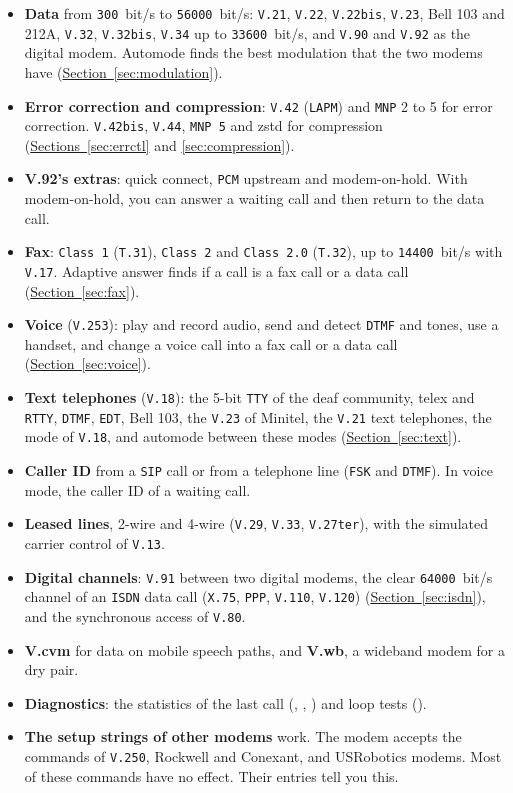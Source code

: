 \documentclass[a5paper,10pt]{article}
\makeatletter
\newcommand{\cmd}[1]{\texttt{#1}}
\newcommand{\std}[1]{\texttt{#1}}
\newcommand{\cmdl}[2][]{\hyperlink{cmd:#1}{\cmd{#2}}}
\let\cmd\@firstofone
\makeatother
\begin{document}
\begin{itemize}
\item \textbf{Data} from \std{300}~bit/s to \std{56000}~bit/s: \std{V.21}, \std{V.22},
  \std{V.22bis}, \std{V.23}, Bell 103 and 212A, \std{V.32}, \std{V.32bis},
  \std{V.34} up to \std{33600}~bit/s, and \std{V.90} and \std{V.92} as the
  digital modem.  Automode finds the best modulation that the two modems
  have (\hyperref[sec:modulation]{Section~\ref*{sec:modulation}}).
\item \textbf{Error correction and compression}: \std{V.42} (\std{LAPM}) and
  \std{MNP} 2 to 5 for error correction.  \std{V.42bis}, \std{V.44}, \std{MNP~5}
  and zstd for compression
  (\hyperref[sec:errctl]{Sections~\ref*{sec:errctl}} and
  \hyperref[sec:compression]{\ref*{sec:compression}}).
\item \textbf{V.92's extras}: quick connect, \std{PCM} upstream and
  modem-on-hold.  With modem-on-hold, you can answer a waiting call and
  then return to the data call.
\item \textbf{Fax}: \std{Class 1} (\std{T.31}), \std{Class 2} and \std{Class 2.0} (\std{T.32}),
  up to \std{14400}~bit/s with \std{V.17}.  Adaptive answer finds if a call is
  a fax call or a data call (\hyperref[sec:fax]{Section~\ref*{sec:fax}}).
\item \textbf{Voice} (\std{V.253}): play and record audio, send and
  detect \std{DTMF} and tones, use a handset, and change a voice call into a
  fax call or a data call (\hyperref[sec:voice]{Section~\ref*{sec:voice}}).
\item \textbf{Text telephones} (\std{V.18}): the 5-bit \std{TTY} of the deaf
  community, telex and \std{RTTY}, \std{DTMF}, \std{EDT}, Bell 103, the \std{V.23}
  of Minitel, the \std{V.21} text telephones, the mode of \std{V.18}, and
  automode between these modes (\hyperref[sec:text]{Section~\ref*{sec:text}}).
\item \textbf{Caller ID} from a \std{SIP} call or from a telephone line (\std{FSK}
  and \std{DTMF}).  In voice mode, the caller ID of a waiting call.
\item \textbf{Leased lines}, 2-wire and 4-wire (\std{V.29}, \std{V.33},
  \std{V.27ter}), with the simulated carrier control of \std{V.13}.
\item \textbf{Digital channels}: \std{V.91} between two digital modems,
  the clear \std{64000}~bit/s channel of an \std{ISDN} data call (\std{X.75}, \std{PPP},
  \std{V.110}, \std{V.120}) (\hyperref[sec:isdn]{Section~\ref*{sec:isdn}}),
  and the synchronous access of \std{V.80}.
\item \textbf{V.cvm} for data on mobile speech paths, and
  \textbf{V.wb}, a wideband modem for a dry pair.
\item \textbf{Diagnostics}: the statistics of the last call (\cmdl[I]{ATI11},
  \cmdl[ampV]{AT\&V1}, \cmdl[hashUD]{AT\#UD}) and loop tests
  (\cmdl[ampT]{AT\&T}).
\item \textbf{The setup strings of other modems} work.  The modem accepts
  the commands of \std{V.250}, Rockwell and Conexant, and USRobotics modems.
  Most of these commands have no effect.  Their entries tell you this.
\end{itemize}
\end{document}
